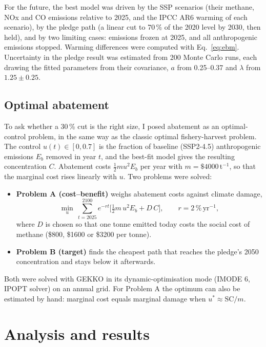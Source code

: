 \documentclass[11pt,a4paper]{article}
\begin{document}
For the future, the best model was driven by the SSP scenarios (their methane, NOx and CO emissions relative to 2025, and the IPCC AR6 warming of each scenario), by the pledge path (a linear cut to 70\,\% of the 2020 level by 2030, then held), and by two limiting cases: emissions frozen at 2025, and all anthropogenic emissions stopped. Warming differences were computed with Eq.~\eqref{eq:ebm}. Uncertainty in the pledge result was estimated from 200 Monte Carlo runs, each drawing the fitted parameters from their covariance, $a$ from 0.25--0.37 and $\lambda$ from $1.25\pm0.25$.

\subsection{Optimal abatement}
To ask whether a 30\,\% cut is the right size, I posed abatement as an optimal-control problem, in the same way as the classic optimal fishery-harvest problem. The control $u(t)\in[0,0.7]$ is the fraction of baseline (SSP2-4.5) anthropogenic emissions $E_b$ removed in year $t$, and the best-fit model gives the resulting concentration $C$. Abatement costs $\tfrac12 m u^2E_b$ per year with $m=\$4000$\,t$^{-1}$, so that the marginal cost rises linearly with $u$. Two problems were solved:
\begin{itemize}\itemsep0pt
\item \textbf{Problem A (cost--benefit)} weighs abatement costs against climate damage,
\begin{equation}
\min_u\ \sum_{t=2025}^{2100} e^{-rt}\Big[\tfrac12 m\,u^2E_b+D\,C\Big],\qquad r=2\,\%\,\text{yr}^{-1},
\end{equation}
where $D$ is chosen so that one tonne emitted today costs the social cost of methane (\$800, \$1600 or \$3200 per tonne).
\item \textbf{Problem B (target)} finds the cheapest path that reaches the pledge's 2050 concentration and stays below it afterwards.
\end{itemize}
Both were solved with GEKKO in its dynamic-optimisation mode (IMODE 6, IPOPT solver) on an annual grid. For Problem A the optimum can also be estimated by hand: marginal cost equals marginal damage when $u^*\approx\mathrm{SC}/m$.

\section{Analysis and results}
\end{document}

